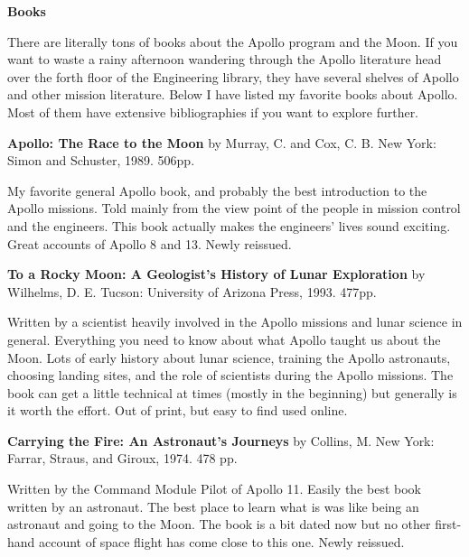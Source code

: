 \documentclass[12pt]{article}
\newenvironment{Quote}
               {\list{}{\setlength{\rightmargin}{5pt}%
                        \setlength{\leftmargin}{5pt}
                        \setlength{\baselineskip}{12pt}}%
                \item\relax}
               {\endlist}
\begin{document}
\parindent 0pt


{\large \bf Books} 

\vskip 2mm

There are literally tons of books about the Apollo program and the
Moon.  If you want to waste a rainy afternoon wandering through the
Apollo literature head over the forth floor of the Engineering
library, they have several shelves of Apollo and other mission
literature.  Below I have listed my favorite books about Apollo.  Most
of them have extensive bibliographies if you want to explore further.

\vskip 5mm

{\bf Apollo: The Race to the Moon} by Murray, C. and Cox, C. B.  New
York: Simon and Schuster, 1989. 506pp.
\begin{Quote}
  My favorite general Apollo book, and probably the best introduction
  to the Apollo missions.  Told mainly from the view point of the
  people in mission control and the engineers.  This book actually
  makes the engineers' lives sound exciting.  Great accounts of Apollo
  8 and 13.  Newly reissued.
\end{Quote}

\vfill

{\bf To a Rocky Moon: A Geologist's History of Lunar Exploration} by
Wilhelms, D. E.  Tucson: University of Arizona Press, 1993. 477pp.
\begin{Quote}
  Written by a scientist heavily involved in the Apollo missions and
  lunar science in general.  Everything you need to know about what
  Apollo taught us about the Moon.  Lots of early history about lunar
  science, training the Apollo astronauts, choosing landing sites, and
  the role of scientists during the Apollo missions.  The book can get
  a little technical at times (mostly in the beginning) but generally
  is it worth the effort.  Out of print, but easy to find used online.
\end{Quote}

\vfill

{\bf Carrying the Fire: An Astronaut's Journeys} by Collins, M.  New
York: Farrar, Straus, and Giroux, 1974. 478 pp.
\begin{Quote}
  Written by the Command Module Pilot of Apollo 11.  Easily the best
  book written by an astronaut.  The best place to learn what is was
  like being an astronaut and going to the Moon.  The book is a bit
  dated now but no other first-hand account of space flight has come
  close to this one.  Newly reissued.
\end{Quote}
\end{document}
